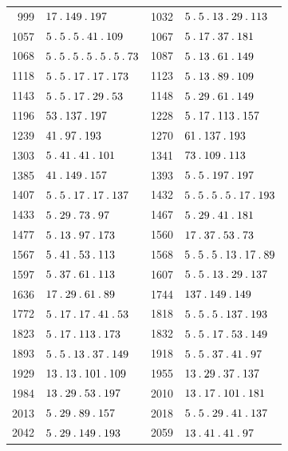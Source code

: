 \begin{longtable}{@{}r|l@{\qquad}r|l@{}}
999 & $17\mathbin{.} 149\mathbin{.} 197$ & 1032 & $5\mathbin{.} 5\mathbin{.} 13\mathbin{.} 29\mathbin{.} 113$\\
1057 & $5\mathbin{.} 5\mathbin{.} 5\mathbin{.} 41\mathbin{.} 109$ & 1067 & $5\mathbin{.} 17\mathbin{.} 37\mathbin{.} 181$\\
1068 & $5\mathbin{.} 5\mathbin{.} 5\mathbin{.} 5\mathbin{.} 5\mathbin{.} 5\mathbin{.} 73$ & 1087 & $5\mathbin{.} 13\mathbin{.} 61\mathbin{.} 149$\\
1118 & $5\mathbin{.} 5\mathbin{.} 17\mathbin{.} 17\mathbin{.} 173$ & 1123 & $5\mathbin{.} 13\mathbin{.} 89\mathbin{.} 109$\\
1143 & $5\mathbin{.} 5\mathbin{.} 17\mathbin{.} 29\mathbin{.} 53$ & 1148 & $5\mathbin{.} 29\mathbin{.} 61\mathbin{.} 149$\\
1196 & $53\mathbin{.} 137\mathbin{.} 197$ & 1228 & $5\mathbin{.} 17\mathbin{.} 113\mathbin{.} 157$\\
1239 & $41\mathbin{.} 97\mathbin{.} 193$ & 1270 & $61\mathbin{.} 137\mathbin{.} 193$\\
1303 & $5\mathbin{.} 41\mathbin{.} 41\mathbin{.} 101$ & 1341 & $73\mathbin{.} 109\mathbin{.} 113$\\
1385 & $41\mathbin{.} 149\mathbin{.} 157$ & 1393 & $5\mathbin{.} 5\mathbin{.} 197\mathbin{.} 197$\\
1407 & $5\mathbin{.} 5\mathbin{.} 17\mathbin{.} 17\mathbin{.} 137$ & 1432 & $5\mathbin{.} 5\mathbin{.} 5\mathbin{.} 5\mathbin{.} 17\mathbin{.} 193$\\
1433 & $5\mathbin{.} 29\mathbin{.} 73\mathbin{.} 97$ & 1467 & $5\mathbin{.} 29\mathbin{.} 41\mathbin{.} 181$\\
1477 & $5\mathbin{.} 13\mathbin{.} 97\mathbin{.} 173$ & 1560 & $17\mathbin{.} 37\mathbin{.} 53\mathbin{.} 73$\\
1567 & $5\mathbin{.} 41\mathbin{.} 53\mathbin{.} 113$ & 1568 & $5\mathbin{.} 5\mathbin{.} 5\mathbin{.} 13\mathbin{.} 17\mathbin{.} 89$\\
1597 & $5\mathbin{.} 37\mathbin{.} 61\mathbin{.} 113$ & 1607 & $5\mathbin{.} 5\mathbin{.} 13\mathbin{.} 29\mathbin{.} 137$\\
1636 & $17\mathbin{.} 29\mathbin{.} 61\mathbin{.} 89$ & 1744 & $137\mathbin{.} 149\mathbin{.} 149$\\
1772 & $5\mathbin{.} 17\mathbin{.} 17\mathbin{.} 41\mathbin{.} 53$ & 1818 & $5\mathbin{.} 5\mathbin{.} 5\mathbin{.} 137\mathbin{.} 193$\\
1823 & $5\mathbin{.} 17\mathbin{.} 113\mathbin{.} 173$ & 1832 & $5\mathbin{.} 5\mathbin{.} 17\mathbin{.} 53\mathbin{.} 149$\\
1893 & $5\mathbin{.} 5\mathbin{.} 13\mathbin{.} 37\mathbin{.} 149$ & 1918 & $5\mathbin{.} 5\mathbin{.} 37\mathbin{.} 41\mathbin{.} 97$\\
1929 & $13\mathbin{.} 13\mathbin{.} 101\mathbin{.} 109$ & 1955 & $13\mathbin{.} 29\mathbin{.} 37\mathbin{.} 137$\\
1984 & $13\mathbin{.} 29\mathbin{.} 53\mathbin{.} 197$ & 2010 & $13\mathbin{.} 17\mathbin{.} 101\mathbin{.} 181$\\
2013 & $5\mathbin{.} 29\mathbin{.} 89\mathbin{.} 157$ & 2018 & $5\mathbin{.} 5\mathbin{.} 29\mathbin{.} 41\mathbin{.} 137$\\
2042 & $5\mathbin{.} 29\mathbin{.} 149\mathbin{.} 193$ & 2059 & $13\mathbin{.} 41\mathbin{.} 41\mathbin{.} 97$\\

\end{longtable}
